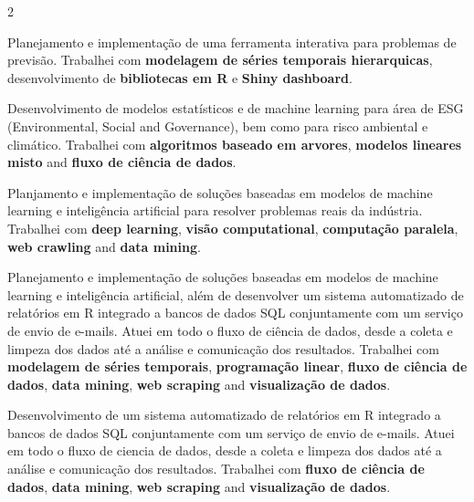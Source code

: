 \documentclass[10pt,a4paper,withhyper]{altacv}
\begin{document}
\begin{paracol}{2}


Planejamento e implementação de uma ferramenta interativa para problemas de previsão. Trabalhei com \textbf{modelagem de séries temporais hierarquicas}, desenvolvimento de \textbf{bibliotecas em R} e \textbf{Shiny dashboard}.

\divider

Desenvolvimento de modelos estatísticos e de machine learning para área de ESG (Environmental, Social and Governance), bem como para risco ambiental e climático. Trabalhei com \textbf{algoritmos baseado em arvores}, \textbf{modelos lineares misto} and \textbf{fluxo de ciência de dados}.

\divider

Planjamento e implementação de soluções baseadas em modelos de machine learning e inteligência artificial para resolver problemas reais da indústria. Trabalhei com \textbf{deep learning}, \textbf{visão computational}, \textbf{computação paralela}, \textbf{web crawling} and \textbf{data mining}.

\divider

Planejamento e implementação de soluções baseadas em modelos de machine learning e inteligência artificial, além de desenvolver um sistema automatizado de relatórios em R integrado a bancos de dados SQL conjuntamente com um serviço de envio de e-mails. Atuei em todo o fluxo de ciência de dados, desde a coleta e limpeza dos dados até a análise e comunicação dos resultados. Trabalhei com \textbf{modelagem de séries temporais}, \textbf{programação linear}, \textbf{fluxo de ciência de dados}, \textbf{data mining}, \textbf{web scraping} and \textbf{visualização de dados}.

\divider

Desenvolvimento de um sistema automatizado de relatórios em R integrado a bancos de dados SQL conjuntamente com um serviço de envio de e-mails. Atuei em todo o fluxo de ciencia de dados, desde a coleta e limpeza dos dados até a análise e comunicação dos resultados. Trabalhei com \textbf{fluxo de ciência de dados}, \textbf{data mining}, \textbf{web scraping} and \textbf{visualização de dados}.


\end{paracol}
\end{document}
